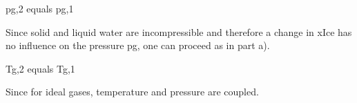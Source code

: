 pg,2 equals pg,1  

Since solid and liquid water are incompressible and therefore a change in xIce has no influence on the pressure pg, one can proceed as in part a).  

Tg,2 equals Tg,1  

Since for ideal gases, temperature and pressure are coupled.